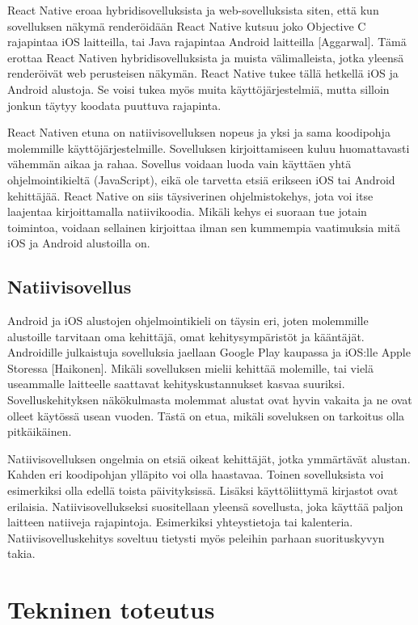 \documentclass{tktltiki}
\begin{document}
React Native eroaa hybridisovelluksista ja web-sovelluksista siten, että kun sovelluksen näkymä renderöidään React Native kutsuu joko Objective C rajapintaa iOS laitteilla, tai Java rajapintaa Android laitteilla [Aggarwal]. Tämä erottaa React Nativen hybridisovelluksista ja muista välimalleista, jotka yleensä renderöivät web perusteisen näkymän. React Native tukee tällä hetkellä iOS ja Android alustoja. Se voisi tukea myös muita käyttöjärjestelmiä, mutta silloin jonkun täytyy koodata puuttuva rajapinta.  

React Nativen etuna on natiivisovelluksen nopeus ja yksi ja sama koodipohja molemmille käyttöjärjestelmille. Sovelluksen kirjoittamiseen kuluu huomattavasti vähemmän aikaa ja rahaa. Sovellus voidaan luoda vain käyttäen yhtä ohjelmointikieltä (JavaScript), eikä ole tarvetta etsiä erikseen iOS tai Android kehittäjää. React Native on siis täysiverinen ohjelmistokehys, jota voi itse laajentaa kirjoittamalla natiivikoodia. Mikäli kehys ei suoraan tue jotain toimintoa, voidaan sellainen kirjoittaa ilman sen kummempia vaatimuksia mitä iOS ja Android alustoilla on.

\subsection{Natiivisovellus}

Android ja iOS alustojen ohjelmointikieli on täysin eri, joten molemmille alustoille tarvitaan oma kehittäjä, omat kehitysympäristöt ja kääntäjät. Androidille julkaistuja sovelluksia jaellaan Google Play kaupassa ja iOS:lle Apple Storessa [Haikonen]. Mikäli sovelluksen mielii kehittää molemille, tai vielä useammalle laitteelle saattavat kehityskustannukset kasvaa suuriksi. Sovelluskehityksen näkökulmasta molemmat alustat ovat hyvin vakaita ja ne ovat olleet käytössä usean vuoden. Tästä on etua, mikäli soveluksen on tarkoitus olla pitkäikäinen.  

Natiivisovelluksen ongelmia on etsiä oikeat kehittäjät, jotka ymmärtävät alustan. Kahden eri koodipohjan ylläpito voi olla haastavaa. Toinen sovelluksista voi esimerkiksi olla edellä toista päivityksissä. Lisäksi käyttöliittymä kirjastot ovat erilaisia. Natiivisovellukseksi suositellaan yleensä sovellusta, joka käyttää paljon laitteen natiiveja rajapintoja. Esimerkiksi yhteystietoja tai kalenteria. Natiivisovelluskehitys soveltuu tietysti myös peleihin parhaan suorituskyvyn takia. 

\newpage
\section{Tekninen toteutus}
\end{document}
